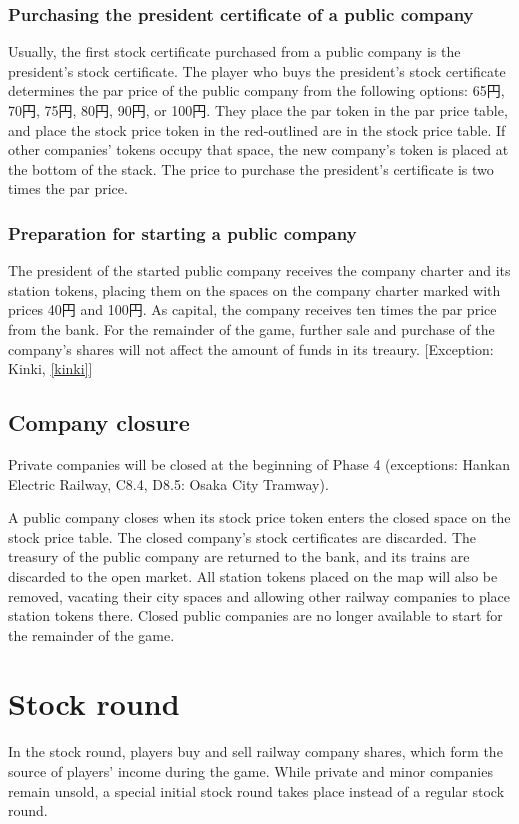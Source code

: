 \documentclass{article}
\begin{document}
\begin{CJK}{UTF8}{min}
\begin{multicols}{2}
\subsubsection{Purchasing the president certificate of a public company}
\label{floating-par-price}
Usually, the first stock certificate purchased from a public company
is the president's stock certificate. The player who buys the
president's stock certificate determines the par price of the public
company from the following options: 65円, 70円, 75円, 80円, 90円, or
100円. They place the par token in the par price table, and place
the stock price token in the red-outlined are in the stock price
table. If other companies' tokens occupy that space, the new company's
token is placed at the bottom of the stack. The price to purchase the
president's certificate is two times the par price.

\subsubsection{Preparation for starting a public company}
\label{floating-initial-capital}
The president of the started public company receives the company
charter and its station tokens, placing them on the spaces on the
company charter marked with prices 40円 and 100円. As capital,
the company receives ten times the par price from the bank. For the
remainder of the game, further sale and purchase of the company's
shares will not affect the amount of funds in its treaury. [Exception:
Kinki, \autoref{kinki}]

\subsection{Company closure}
Private companies will be closed at the beginning of Phase 4
(exceptions: Hankan Electric Railway, C8.4, D8.5: Osaka City Tramway).

A public company closes when its stock price token enters the closed
space on the stock price table. The closed company's stock
certificates are discarded. The treasury of the public company are
returned to the bank, and its trains are discarded to the open
market. All station tokens placed on the map will also be removed,
vacating their city spaces and allowing other railway companies to
place station tokens there. Closed public companies are no longer
available to start for the remainder of the game.


\section{Stock round}
In the stock round, players buy and sell railway company shares, which
form the source of players' income during the game. While private and
minor companies remain unsold, a special initial stock round takes
place instead of a regular stock round.


\end{multicols}
\end{CJK}
\end{document}
